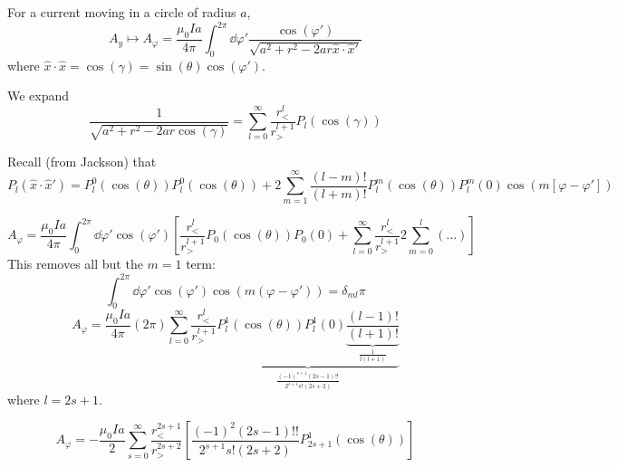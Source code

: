 \documentclass[a4paper,twoside,master.tex]{subfiles}
\begin{document}

For a current moving in a circle of radius $ a $,
\begin{equation}
    A_y \mapsto A_{\varphi} = \frac{\mu_0 I a}{4 \pi} \int_0^{2 \pi} \dd{\varphi'} \frac{\cos(\varphi')}{\sqrt{a^2 + r^2 - 2ar \hat{x} \cdot \hat{x}'}}
\end{equation}
where $ \hat{x} \cdot \hat{x} = \cos(\gamma) = \sin(\theta) \cos(\varphi ')$.

We expand
\begin{equation}
    \frac{1}{\sqrt{a^2 + r^2 - 2ar \cos(\gamma)}} = \sum_{l=0}^{\infty} \frac{r_<^l}{r_>^{l+1}} P_l(\cos(\gamma))
\end{equation}

Recall (from Jackson) that
\begin{equation}
    P_l( \hat{x} \cdot \hat{x}') = P_l^0(\cos(\theta)) P_l^0(\cos(\theta)) + 2 \sum_{m=1}^{\infty} \frac{(l-m)!}{(l+m)!} P_l^m(\cos(\theta)) P_l^m(0) \cos(m[\varphi - \varphi']) 
\end{equation}

\begin{equation}
    A_{\varphi} = \frac{\mu_0 I a}{4 \pi} \int_0^{2 \pi} \dd{\varphi'} \cos(\varphi') \left[ \frac{r_<^l}{r_>^{l+1}} P_0(\cos(\theta)) P_0(0) + \sum_{l=0}^{\infty} \frac{r_<^l}{r_>^{l+1}} 2 \sum_{m=0}^{l} (\dots) \right]
\end{equation}
This removes all but the $ m = 1 $ term:
\begin{equation}
    \int_0^{2 \pi} \dd{\varphi'} \cos(\varphi') \cos(m(\varphi - \varphi')) = \delta_{ml} \pi
\end{equation}
\begin{equation}
    A_{\varphi} = \frac{\mu_0 I a}{4 \pi} (2 \pi) \sum_{l=0}^{\infty} \frac{r_<^l}{r_>^{l+1}} \underbrace{ P_l^1(\cos(\theta)) P_l^1(0) \underbrace{ \frac{(l-1)!}{(l+1)!}} _{\frac{1}{l(l+1)}}}_{\frac{(-1)^{s+1}(2s-1)!!}{2^{s+1} s!(2s+2)}}
\end{equation} where $ l = 2s + 1 $.

\begin{equation}
    A_{\varphi} = - \frac{\mu_0 I a}{2} \sum_{s=0}^{\infty} \frac{r_<^{2s+1}}{r_>^{2s+2}} \left[ \frac{(-1)^2(2s-1)!!}{2^{s+1}s!(2s+2)} P_{2s+1}^1(\cos(\theta)) \right]
\end{equation}
\end{document}
